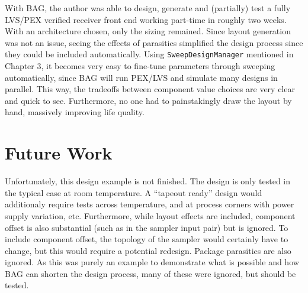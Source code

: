 With BAG, the author was able to design, generate and (partially) test a fully LVS/PEX verified receiver front end working part-time in roughly two weeks. With an architecture chosen, only the sizing remained. Since layout generation was not an issue, seeing the effects of parasitics simplified the design process since they could be included automatically. Using \texttt{SweepDesignManager} mentioned in Chapter 3, it becomes very easy to fine-tune parameters through sweeping automatically, since BAG will run PEX/LVS and simulate many designs in parallel. This way, the tradeoffs between component value choices are very clear and quick to see. Furthermore, no one had to painstakingly draw the layout by hand, massively improving life quality.

\section{Future Work}
Unfortunately, this design example is not finished. The design is only tested in the typical case at room temperature. A ``tapeout ready'' design would additionaly require tests across temperature, and at process corners with power supply variation, etc. Furthermore, while layout effects are included, component offset is also substantial (such as in the sampler input pair) but is ignored. To include component offset, the topology of the sampler would certainly have to change, but this would require a potential redesign. Package parasitics are also ignored. As this was purely an example to demonstrate what is possible and how BAG can shorten the design process, many of these were ignored, but should be tested.

